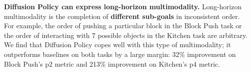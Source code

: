 \documentclass[Afour,sageh,times]{sagej}
\begin{document}




\textbf{Diffusion Policy can express long-horizon multimodality.}
Long-horizon multimodality is the completion of \textbf{different sub-goals} in inconsistent order. For example, the order of pushing a particular block in the Block Push task or the order of interacting with 7 possible objects in the Kitchen task are arbitrary.
%
We find that Diffusion Policy copes well with this type of multimodality; it outperforms baselines on both tasks by a large margin: 32\% improvement on Block Push's p2 metric and 213\% improvement on Kitchen's p4 metric.
\end{document}
